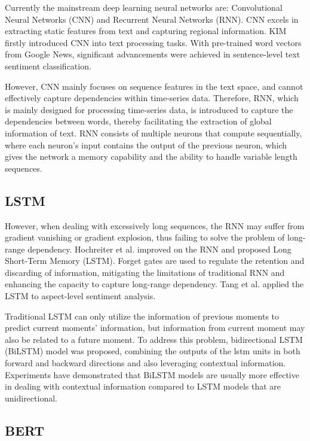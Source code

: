 \documentclass[ %
                    author={Louis Wang},
                supervisor={Dr. Qiang Liu},
                    degree={MSc},
                     title={Identification of Suicide Ideation in Texts},
                      type={},
                      year={2024}]{dissertation}
\begin{document}
Currently the mainstream deep learning neural networks are: Convolutional Neural Networks (CNN)\cite{chua1998cnn} and Recurrent Neural Networks (RNN)\cite{socher2011parsing}. CNN excels in extracting static features from text and capturing regional information. KIM firstly introduced CNN into text processing tasks. With pre-trained word vectors from Google News, significant advancements were achieved in sentence-level text sentiment classification.\cite{2014Convolutional} 

However, CNN mainly focuses on sequence features in the text space, and cannot effectively capture dependencies within time-series data. Therefore, RNN, which is mainly designed for processing time-series data, is introduced to capture the dependencies between words, thereby facilitating the extraction of global information of text. RNN consists of multiple neurons that compute sequentially, where each neuron's input contains the output of the previous neuron, which gives the network a memory capability and the ability to handle variable length sequences.

\subsection{LSTM}
\noindent
However, when dealing with excessively long sequences, the RNN may suffer from gradient vanishing or gradient explosion, thus failing to solve the problem of long-range dependency. Hochreiter et al. improved on the RNN and proposed Long Short-Term Memory (LSTM).\cite{hochreiter1997long} Forget gates are used to regulate the retention and discarding of information\cite{greff2016lstm}, mitigating the limitations of traditional RNN and enhancing the capacity to capture long-range dependency. Tang et al. applied the LSTM to aspect-level sentiment analysis.\cite{tang2015target}

Traditional LSTM can only utilize the information of previous moments to predict current moments' information, but information from current moment may also be related to a future moment. To address this problem, bidirectional LSTM (BiLSTM) model was proposed, combining the outputs of the lstm units in both forward and backward directions and also leveraging contextual information. Experiments have demonstrated that BiLSTM models are usually more effective in dealing with contextual information compared to LSTM models that are unidirectional.\cite{hameed2019computationally}

\subsection{BERT}
\end{document}
